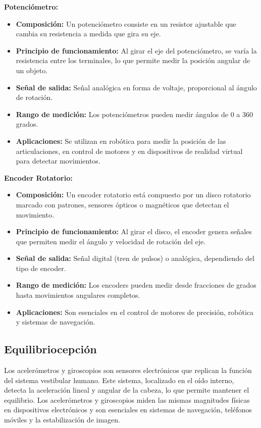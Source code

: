 \documentclass[conference]{IEEEtran}
\begin{document}
\textbf{Potenciómetro:}
\begin{itemize}
    \item \textbf{Composición:} Un potenciómetro consiste en un resistor ajustable que cambia su resistencia a medida que gira su eje.
    \item \textbf{Principio de funcionamiento:} Al girar el eje del potenciómetro, se varía la resistencia entre los terminales, lo que permite medir la posición angular de un objeto.
    \item \textbf{Señal de salida:} Señal analógica en forma de voltaje, proporcional al ángulo de rotación.
    \item \textbf{Rango de medición:} Los potenciómetros pueden medir ángulos de 0 a 360 grados.
    \item \textbf{Aplicaciones:} Se utilizan en robótica para medir la posición de las articulaciones, en control de motores y en dispositivos de realidad virtual para detectar movimientos.
\end{itemize}
\textbf{Encoder Rotatorio:}
\begin{itemize}
    \item \textbf{Composición:} Un encoder rotatorio está compuesto por un disco rotatorio marcado con patrones, sensores ópticos o magnéticos que detectan el movimiento.
    \item \textbf{Principio de funcionamiento:} Al girar el disco, el encoder genera señales que permiten medir el ángulo y velocidad de rotación del eje.
    \item \textbf{Señal de salida:} Señal digital (tren de pulsos) o analógica, dependiendo del tipo de encoder.
    \item \textbf{Rango de medición:} Los encoders pueden medir desde fracciones de grados hasta movimientos angulares completos.
    \item \textbf{Aplicaciones:} Son esenciales en el control de motores de precisión, robótica y sistemas de navegación.
\end{itemize}


\subsection{Equilibriocepción}

Los acelerómetros y giroscopios son sensores electrónicos que replican la función del sistema vestibular humano. Este sistema, localizado en el oído interno, detecta la aceleración lineal y angular de la cabeza, lo que permite mantener el equilibrio. Los acelerómetros y giroscopios miden las mismas magnitudes físicas en dispositivos electrónicos y son esenciales en sistemas de navegación, teléfonos móviles y la estabilización de imagen.\\
\end{document}
